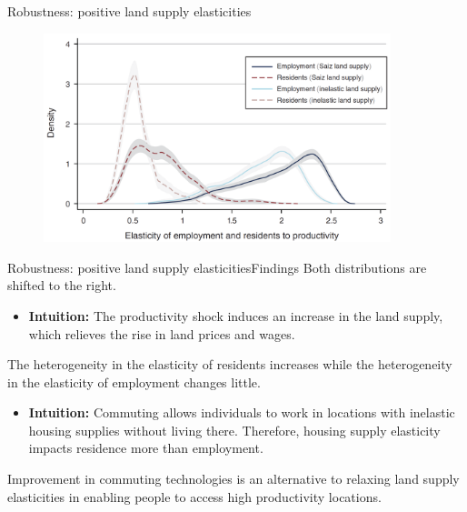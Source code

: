 \documentclass{beamer}
\begin{document}
\begin{frame}{Robustness: positive land supply elasticities}
	\begin{figure}[htbp]
		\centering
		\includegraphics[width=0.9\textwidth]{fig3.png}
	\end{figure}
\end{frame}
\begin{frame}{Robustness: positive land supply elasticities}{Findings}
	Both distributions are shifted to the right.
	\begin{itemize}
		\item \textbf{Intuition:} The productivity shock induces an increase in the land supply, which relieves the rise in land prices and wages.
	\end{itemize}
	\medskip

	The heterogeneity in the elasticity of residents increases while the heterogeneity in the elasticity of employment changes little.
	\begin{itemize}
		\item \textbf{Intuition:} Commuting allows individuals to work in locations with inelastic housing supplies without living there. Therefore, housing supply elasticity impacts residence more than employment.
	\end{itemize}
	\begin{block}{}
		Improvement in commuting technologies is an alternative to relaxing land supply elasticities in enabling people to access high productivity locations.
	\end{block}
\end{frame}
\end{document}
